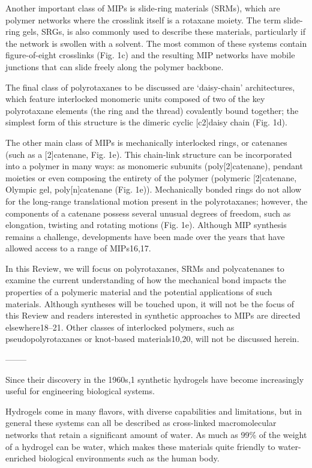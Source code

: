 \documentclass[../../main-notes.tex]{subfiles}
\begin{document}
Another important class of MIPs is slide-ring materials (SRMs), which are polymer networks where the crosslink itself is a rotaxane moiety. 
The term slide-ring gels, SRGs, is also commonly used to describe these materials, particularly if the network is swollen with a solvent. 
The most common of these systems contain figure-of-eight crosslinks (Fig. 1c) and the resulting MIP networks have mobile junctions that can slide freely along the polymer backbone. 

The final class of polyrotaxanes to be discussed are ‘daisy-chain’ architectures, which feature interlocked monomeric units composed of two of the key polyrotaxane elements (the ring and the thread) covalently bound together; the simplest form of this structure is the dimeric cyclic [c2]daisy chain (Fig. 1d).

The other main class of MIPs is mechanically interlocked rings, or catenanes (such as a [2]catenane, Fig. 1e). 
This chain-link structure can be incorporated into a polymer in many ways: as monomeric subunits (poly[2]catenane), pendant moieties or even composing the entirety of the polymer (polymeric [2]catenane, Olympic gel, poly[n]catenane (Fig. 1e)). 
Mechanically bonded rings do not allow for the long-range translational motion present in the polyrotaxanes; however, the components of a catenane possess several unusual degrees of freedom, such as elongation, twisting and rotating motions (Fig. 1e). 
Although MIP synthesis remains a challenge, developments have been made over the years that have allowed access to a range of MIPs16,17. 

In this Review, we will focus on polyrotaxanes, SRMs and polycatenanes to examine the current understanding of how the mechanical bond impacts the properties of a polymeric material and the potential applications of such materials. 
Although syntheses will be touched upon, it will not be the focus of this Review and readers interested in synthetic approaches to MIPs are directed elsewhere18–21. 
Other classes of interlocked polymers, such as pseudopolyrotaxanes or knot-based materials10,20, will not be discussed herein.

--------

\citep{correaTranslationalApplicationsHydrogels2021}

Since their discovery in the 1960s,1 synthetic hydrogels have become increasingly useful for engineering biological systems.

Hydrogels come in many flavors, with diverse capabilities and limitations, but in general these systems can all be described as cross-linked macromolecular networks that retain a significant amount of water. 
As much as 99\% of the weight of a hydrogel can be water, which makes these materials quite friendly to water-enriched biological environments such as the human body. 
\end{document}

